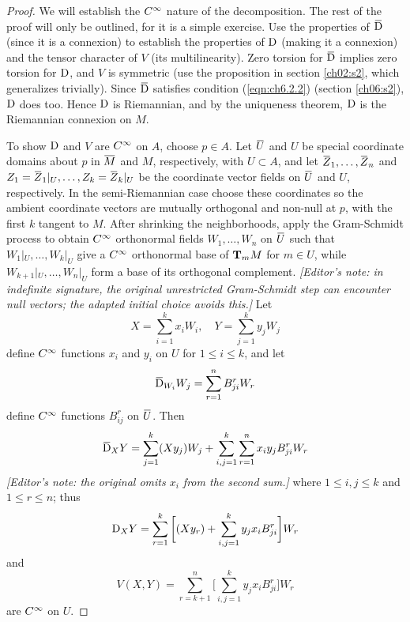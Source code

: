 \documentclass[../main]{subfiles}
\begin{document}
\begin{proof}
We will establish the $\CInfty$ nature of the decomposition. The rest of the proof will only be outlined, for it is a simple exercise. Use the properties of $\covariant$ (since it is a connexion) to establish the properties of $\D$ (making it a connexion) and the tensor character of $V$ (its multilinearity). Zero torsion for $\covariant$ implies zero torsion for $\D$, and $V$ is symmetric (use the proposition in section \ref{ch02:s2}, which generalizes trivially). Since $\covariant$ satisfies condition (\ref{eqn:ch6.2.2}) (section \ref{ch06:s2}), $\D$ does too. Hence $\D$ is Riemannian, and by the uniqueness theorem, $\D$ is the Riemannian connexion on $M$.

To show $\D$ and $V$ are $\CInfty$ on $A$, choose $p\in A$. Let $\xoverline U$ and $U$ be special coordinate domains about $p$ in $\xoverline M$ and $M$, respectively, with $U\subset A$, and let $\xoverline Z_1,\ldots,\xoverline Z_n$ and $Z_1=\xoverline Z_1|_U,\ldots,Z_k=\xoverline Z_k|_U$ be the coordinate vector fields on $\xoverline U$ and $U$, respectively. In the semi-Riemannian case choose these coordinates so the ambient coordinate vectors are mutually orthogonal and non-null at $p$, with the first $k$ tangent to $M$. After shrinking the neighborhoods, apply the Gram-Schmidt process to obtain $\CInfty$ orthonormal fields $W_1,\ldots,W_n$ on $\xoverline U$ such that $W_1|_U,\ldots,W_k|_U$ give a $\CInfty$ orthonormal base of $\tangentspace{M}{m}$ for $m\in U$, while $W_{k+1}|_U,\ldots,W_n|_U$ form a base of its orthogonal complement. \emph{[Editor's note: in indefinite signature, the original unrestricted Gram-Schmidt step can encounter null vectors; the adapted initial choice avoids this.]} Let
\[X = \sum_{i=1}^k x_iW_i,
\quad Y = \sum_{j=1}^k y_jW_j\]
define $\CInfty$ functions $x_i$ and $y_i$ on $U$ for $1\le i\le k$, and let
\[\covariant_{W_i}W_j = \sum_{r=1}^n B_{ji}^rW_r\]
define $\CInfty$ functions $B_{ij}^r$ on $\xoverline U$. Then
\[\covariant_XY = \sum_{j=1}^k(Xy_j)W_j + \sum_{i,j=1}^k\sum_{r=1}^n x_i y_j B_{ji}^rW_r\]
\emph{[Editor's note: the original omits $x_i$ from the second sum.]}
where $1\le i,j\le k$ and $1\le r\le n$; thus
\[\D_XY = \sum_{r=1}^k\bigg[(Xy_r) + \sum_{i,j=1}^k y_jx_iB_{ji}^r\bigg]W_r\]
and
\[V(X,Y) = \sum_{r=k+1}^n\bigg[\sum_{i,j=1}^k y_jx_iB_{ji}^r\bigg]W_r\]
are $\CInfty$ on $U$.
\end{proof}
\end{document}
